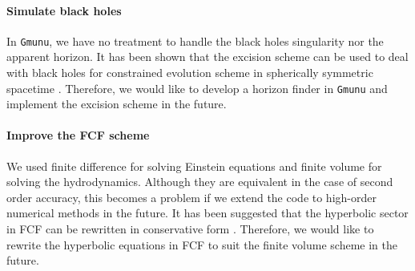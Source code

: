 \paragraph{Simulate black holes}
In \texttt{Gmunu}, we have no treatment to handle the black holes singularity nor the apparent horizon.
It has been shown that the excision scheme can be used to deal with black holes for constrained evolution scheme in spherically symmetric spacetime \cite{cordero2014excision}.
Therefore, we would like to develop a horizon finder in \texttt{Gmunu} and implement the excision scheme in the future.

\paragraph{Improve the FCF scheme}
We used finite difference for solving Einstein equations and finite volume for solving the hydrodynamics.
Although they are equivalent in the case of second order accuracy,
this becomes a problem if we extend the code to high-order numerical methods in the future.
It has been suggested that the hyperbolic sector in FCF can be rewritten in conservative form \cite{cordero2008mathematical}.
Therefore, we would like to rewrite the hyperbolic equations in FCF to suit the finite volume scheme in the future.
